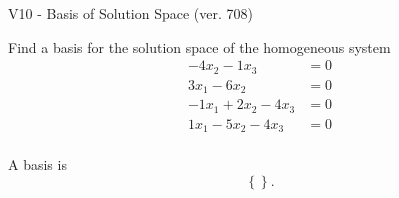 \begin{exercise}
  \begin{exerciseTitle}V10 - Basis of Solution Space (ver. 708)\end{exerciseTitle}
  \begin{exerciseStatement}
    Find a basis for the solution space of the homogeneous system 
\begin{align*}
 -4 x_ 2 -1 x_ 3 &= 0  \\ 
  3 x_ 1 -6 x_ 2 &= 0  \\ 
  -1 x_ 1 + 2 x_ 2 -4 x_ 3 &= 0  \\ 
  1 x_ 1 -5 x_ 2 -4 x_ 3 &= 0  \\ 
 \end{align*}


 
  \end{exerciseStatement}

  \begin{exerciseAnswer}
   A basis is   
\[\left\{\right\}.\]

  


  \end{exerciseAnswer}
\end{exercise}